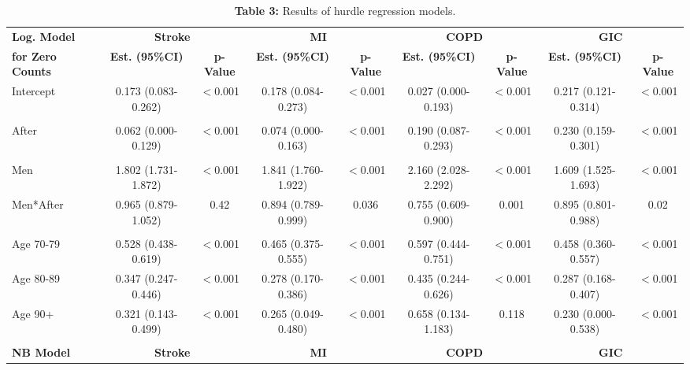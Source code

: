 \begin{landscape}

\begin{table}[H]
  \scriptsize
  \centering
  \caption*{\textbf{Table 3:} Results of hurdle regression models.}
    \begin{tabular}{lcccccccc}
    \toprule
    \textbf{Log. Model } & \multicolumn{2}{c}{\textbf{Stroke}} & \multicolumn{2}{c}{\textbf{MI}} & \multicolumn{2}{c}{\textbf{COPD}} & \multicolumn{2}{c}{\textbf{GIC}} \\
    \textbf{for Zero Counts } & \textbf{Est. (95\%CI)} & \textbf{p-Value} & \textbf{Est. (95\%CI)} & \textbf{p-Value} & \textbf{Est. (95\%CI)} & \textbf{p-Value} & \textbf{Est. (95\%CI)} & \textbf{p-Value} \\
    \midrule
    Intercept & 0.173 (0.083-0.262) & $<$0.001 & 0.178 (0.084-0.273) & $<$0.001 & 0.027 (0.000-0.193) & $<$0.001 & 0.217 (0.121-0.314) & $<$0.001 \\
          &       &       &       &       &       &       &       &  \\
    After  & 0.062 (0.000-0.129) & $<$0.001 & 0.074 (0.000-0.163) & $<$0.001 & 0.190 (0.087-0.293) & $<$0.001 & 0.230 (0.159-0.301) & $<$0.001 \\
          &       &       &       &       &       &       &       &  \\
    Men   & 1.802 (1.731-1.872) & $<$0.001 & 1.841 (1.760-1.922) & $<$0.001 & 2.160 (2.028-2.292) & $<$0.001 & 1.609 (1.525-1.693) & $<$0.001 \\
    Men*After  & 0.965 (0.879-1.052) & 0.42  & 0.894 (0.789-0.999) & 0.036 & 0.755 (0.609-0.900) & 0.001 & 0.895 (0.801-0.988) & 0.02 \\
          &       &       &       &       &       &       &       &  \\
    Age 70-79 & 0.528 (0.438-0.619) & $<$0.001 & 0.465 (0.375-0.555) & $<$0.001 & 0.597 (0.444-0.751) & $<$0.001 & 0.458 (0.360-0.557) & $<$0.001 \\
    Age 80-89 & 0.347 (0.247-0.446) & $<$0.001 & 0.278 (0.170-0.386) & $<$0.001 & 0.435 (0.244-0.626) & $<$0.001 & 0.287 (0.168-0.407) & $<$0.001 \\
    Age 90+ & 0.321 (0.143-0.499) & $<$0.001 & 0.265 (0.049-0.480) & $<$0.001 & 0.658 (0.134-1.183) & 0.118 & 0.230 (0.000-0.538) & $<$0.001 \\
    \midrule
          &       &       &       &       &       &       &       &  \\
    \midrule
    \textbf{NB Model} & \multicolumn{2}{c}{\textbf{Stroke}} & \multicolumn{2}{c}{\textbf{MI}} & \multicolumn{2}{c}{\textbf{COPD}} & \multicolumn{2}{c}{\textbf{GIC}} \\

\end{tabular}
\end{table}
\end{landscape}
